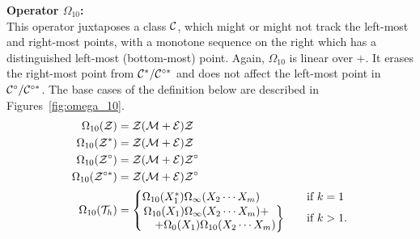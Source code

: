 \documentclass[12pt, a4paper, twoside]{report}
\begin{document}
\noindent\textbf{Operator $\Omega_{10}$:}\\
This operator juxtaposes a class $\mathcal{C}$, which might or might not track the left-most and right-most points, with a monotone sequence on the right which has a distinguished left-most (bottom-most) point. Again, $\Omega_{10}$ is linear over $+$. It erases the right-most point from $\mathcal{C}^*/\mathcal{C}^{\circ*}$ and does not affect the left-most point in $\mathcal{C}^\circ/\mathcal{C}^{\circ*}$. The base cases of the definition below are described in Figures~\ref{fig:omega_10}. 
\begin{align}
  \begin{aligned}
  \Omega_{10}(\mathcal{Z}) &= \mathcal{Z}(\mathcal{M}+\mathcal{E})\mathcal{Z}\\
  \Omega_{10}(\mathcal{Z}^*) &= \mathcal{Z}(\mathcal{M}+\mathcal{E})\mathcal{Z}\\
  \Omega_{10}(\mathcal{Z}^\circ) &= \mathcal{Z}(\mathcal{M}+\mathcal{E})\mathcal{Z}^\circ\\
  \Omega_{10}(\mathcal{Z}^{\circ*}) &= \mathcal{Z}(\mathcal{M}+\mathcal{E})\mathcal{Z}^\circ\\
  \Omega_{10}(\mathcal{T}_h) &=
                      \begin{cases}
                        \Omega_{10}(X_1^*)\Omega_\infty(X_2\cdots X_m)  &\text{if $k = 1$}\\
                        \begin{rcases}
                          \Omega_{10}(X_1)\Omega_\infty(X_2\cdots X_m)+\\
                          \quad+\Omega_0(X_1)\Omega_{10}(X_2\cdots X_m)
                        \end{rcases} \quad &\text{if $k>1$.}
                      \end{cases}
                    \end{aligned}
\label{eq:iterjuxt_def_omega10}
\end{align}
\end{document}
